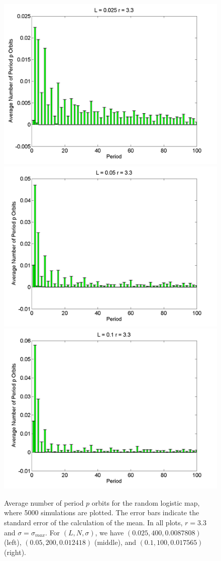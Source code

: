\begin{figure}[H]\linespread{1}
\caption[Average number of period $p$ orbits for the random logistic
map, $\sigma=\sigma_{max}$ and $r=3.3$]{Average number of period $p$ orbits for the random logistic
map, where 5000 simulations are plotted. The error bars indicate
the standard error of the calculation of the mean. In all plots,
$r=3.3$ and $\sigma=\sigma_{max}$. For $(L,N,\sigma)$,
we have $(0.025, 400, 0.0087808)$ (left), $(0.05, 200, 0.012418)$
(middle), and $(0.1, 100, 0.017565)$ (right).}\label{fig:rloghist}
	\begin{center}
\includegraphics[width=.33\textwidth]{figs/rlog_hist_L_0025_r_33_s_00087808_a_96372e-07_sims_5000.png}\hfill		\includegraphics[width=.33\textwidth]{figs/rlog_hist_L_005_r_33_s_0012418_a_38546e-06_sims_5000.png}\hfill
\includegraphics[width=.33\textwidth]{figs/rlog_hist_L_01_r_33_s_0017565_a_15414e-05_sims_5000.png}
	\end{center}
\end{figure}

